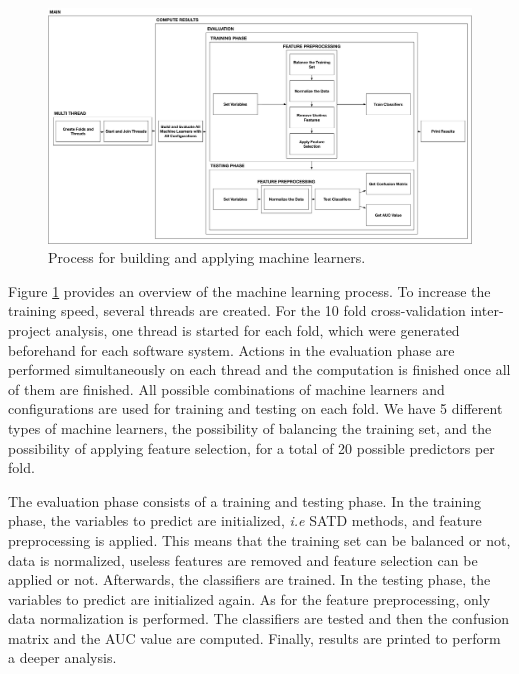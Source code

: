 
\begin{landscape}
 \begin{figure}[t]
 	\centering
 	\includegraphics[width=\linewidth]{figs/MachineLearning.pdf}
 	\caption{Process for building and applying machine learners.}
 	\label{fig:MLProcess}
 	\vspace{-4mm}
 \end{figure}
\end{landscape}
 
 
 Figure \ref{fig:MLProcess} provides an overview of the machine learning process. To increase the training speed, several threads are created. For the 10 fold cross-validation inter-project analysis, one thread is started for each fold, which were generated beforehand for each software system. Actions in the evaluation phase are performed simultaneously on each thread and the computation is finished once all of them are finished. All possible combinations of machine learners and configurations are used for training and testing on each fold. We have 5 different types of machine learners, the possibility of balancing the training set, and the possibility of applying feature selection, for a total of 20 possible predictors per fold. \par
 
 The evaluation phase consists of a training and testing phase. In the training phase, the variables to predict are initialized, \emph{i.e} \ac{SATD} methods, and feature preprocessing is applied. This means that the training set can be balanced or not, data is normalized, useless features are removed and feature selection can be applied or not. Afterwards, the classifiers are trained. In the testing phase, the variables to predict are initialized again. As for the feature preprocessing, only data normalization is performed. The classifiers are tested and then the confusion matrix and the AUC value are computed. Finally, results are printed to perform a deeper analysis.
 
